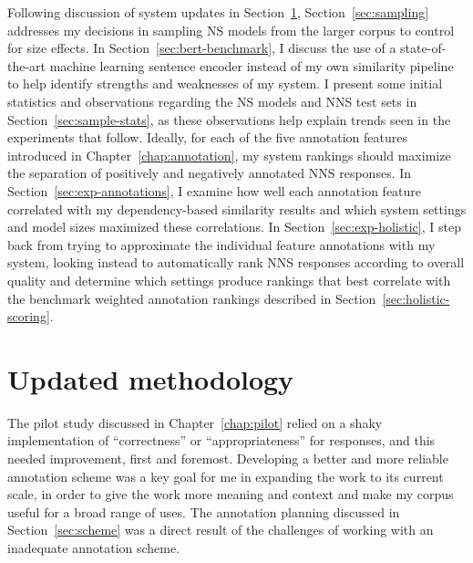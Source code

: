 Following discussion of system updates in Section~\ref{sec:current-method}, Section~\ref{sec:sampling} addresses my decisions in sampling NS models from the larger corpus to control for size effects. In Section~\ref{sec:bert-benchmark}, I discuss the use of a state-of-the-art machine learning sentence encoder instead of my own similarity pipeline to help identify strengths and weaknesses of my system.
I present some initial statistics and observations regarding the NS models and NNS test sets in Section~\ref{sec:sample-stats}, as these observations help explain trends seen in the experiments that follow. 
Ideally, for each of the five annotation features introduced in Chapter~\ref{chap:annotation}, my system rankings should maximize the separation of positively and negatively annotated NNS responses.
In Section~\ref{sec:exp-annotations}, I examine how well each annotation feature correlated with my dependency-based similarity results and which system settings and model sizes maximized these correlations. In Section~\ref{sec:exp-holistic}, I step back from trying to approximate the individual feature annotations with my system, looking instead to automatically rank NNS responses according to overall quality and determine which settings produce rankings that best correlate with the benchmark weighted annotation rankings described in Section~\ref{sec:holistic-scoring}.


\section{Updated methodology}
\label{sec:current-method}
The pilot study discussed in Chapter~\ref{chap:pilot} relied on a shaky implementation of ``correctness'' or ``appropriateness'' for responses, and this needed improvement, first and foremost. Developing a better and more reliable annotation scheme was a key goal for me in expanding the work to its current scale, in order to give the work more meaning and context and make my corpus useful for a broad range of uses. The annotation planning discussed in Section~\ref{sec:scheme} was a direct result of the challenges of working with an inadequate annotation scheme. 

